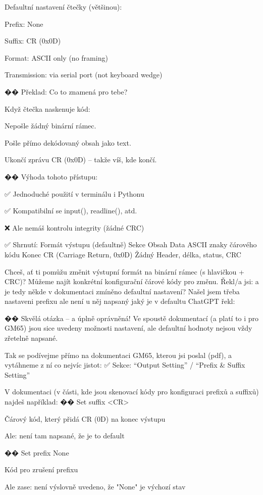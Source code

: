 Defaultní nastavení čtečky (většinou):

    Prefix: None

    Suffix: CR (0x0D)

    Format: ASCII only (no framing)

    Transmission: via serial port (not keyboard wedge)

�� Překlad: Co to znamená pro tebe?

Když čtečka naskenuje kód:

    Nepošle žádný binární rámec.

    Pošle přímo dekódovaný obsah jako text.

    Ukončí zprávu CR (0x0D) – takže víš, kde končí.

�� Výhoda tohoto přístupu:

    ✅ Jednoduché použití v terminálu i Pythonu

    ✅ Kompatibilní se input(), readline(), atd.

    ❌ Ale nemáš kontrolu integrity (žádné CRC)

✅ Shrnutí: Formát výstupu (defaultně)
Sekce	Obsah
Data	ASCII znaky čárového kódu
Konec	CR (Carriage Return, 0x0D)
Žádný	Header, délka, status, CRC

Chceš, ať ti pomůžu změnit výstupní formát na binární rámec (s hlavičkou + CRC)? Můžeme najít konkrétní konfigurační čárové kódy pro změnu.
Řekl/a jsi:
a je tedy někde v dokumentaci zmíněno defaultní nastavení? Našel jsem třeba nastaveni prefixu ale není u něj napsaný jaký je v defaultu
ChatGPT řekl:

�� Skvělá otázka – a úplně oprávněná!
Ve spoustě dokumentací (a platí to i pro GM65) jsou sice uvedeny možnosti nastavení, ale defaultní hodnoty nejsou vždy zřetelně napsané.

Tak se podívejme přímo na dokumentaci GM65, kterou jsi poslal (pdf), a vytáhneme z ní co nejvíc jistot:
✅ Sekce: “Output Setting” / “Prefix & Suffix Setting”

V dokumentaci (v části, kde jsou skenovací kódy pro konfiguraci prefixů a suffixů) najdeš například:
�� Set suffix <CR>

    Čárový kód, který přidá CR (0D) na konec výstupu

    Ale: není tam napsané, že je to default

�� Set prefix None

    Kód pro zrušení prefixu

    Ale zase: není výslovně uvedeno, že "None" je výchozí stav

